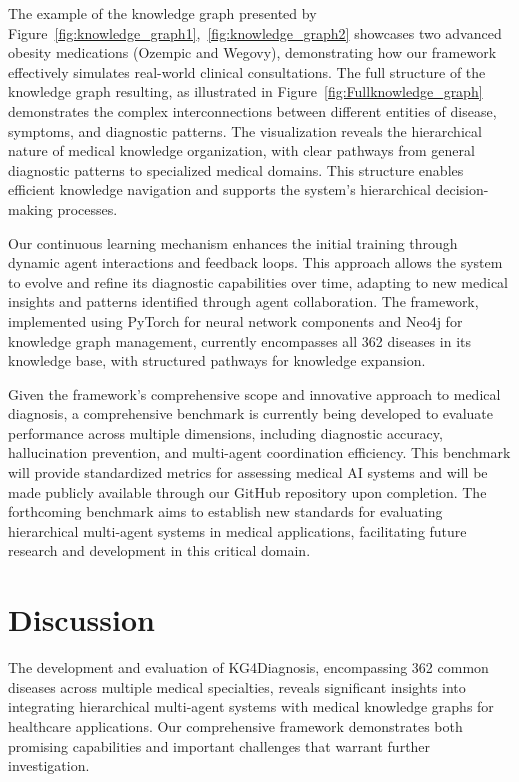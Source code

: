 \documentclass[letterpaper]{article} %
\begin{document}
The example of the knowledge graph presented by Figure~\ref{fig:knowledge_graph1},~\ref{fig:knowledge_graph2} showcases two advanced obesity medications (Ozempic and Wegovy), demonstrating how our framework effectively simulates real-world clinical consultations. The full structure of the knowledge graph resulting, as illustrated in Figure~\ref{fig:Fullknowledge_graph} demonstrates the complex interconnections between different entities of disease, symptoms, and diagnostic patterns. The visualization reveals the hierarchical nature of medical knowledge organization, with clear pathways from general diagnostic patterns to specialized medical domains. This structure enables efficient knowledge navigation and supports the system's hierarchical decision-making processes.

Our continuous learning mechanism enhances the initial training through dynamic agent interactions and feedback loops. This approach allows the system to evolve and refine its diagnostic capabilities over time, adapting to new medical insights and patterns identified through agent collaboration. The framework, implemented using PyTorch for neural network components and Neo4j for knowledge graph management, currently encompasses all 362 diseases in its knowledge base, with structured pathways for knowledge expansion.

Given the framework's comprehensive scope and innovative approach to medical diagnosis, a comprehensive benchmark is currently being developed to evaluate performance across multiple dimensions, including diagnostic accuracy, hallucination prevention, and multi-agent coordination efficiency. This benchmark will provide standardized metrics for assessing medical AI systems and will be made publicly available through our GitHub repository upon completion. The forthcoming benchmark aims to establish new standards for evaluating hierarchical multi-agent systems in medical applications, facilitating future research and development in this critical domain.


\section{Discussion}
The development and evaluation of KG4Diagnosis, encompassing 362 common diseases across multiple medical specialties, reveals significant insights into integrating hierarchical multi-agent systems with medical knowledge graphs for healthcare applications. Our comprehensive framework demonstrates both promising capabilities and important challenges that warrant further investigation.
\end{document}
